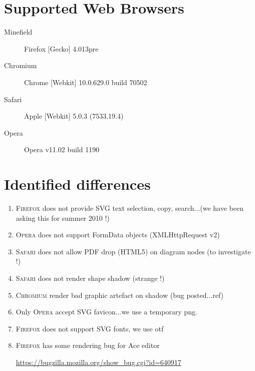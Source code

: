 \documentclass{article}
\newcommand{\ff}{\textsc{Firefox}\xspace}
\newcommand{\ch}{\textsc{Chromium}\xspace}
\newcommand{\sa}{\textsc{Safari}\xspace}
\newcommand{\op}{\textsc{Opera}\xspace}
\begin{document}
\section{Supported Web Browsers}
\date{\today}
\begin{description}
\item[Minefield] Firefox [Gecko] 4.013pre
\item[Chromium] Chrome [Webkit] 10.0.629.0 build 70502
\item[Safari] Apple [Webkit] 5.0.3 (7533.19.4)
\item[Opera] Opera v11.02 build 1190
\end{description}

\section{Identified differences}
\begin{enumerate}
\item \ff does not provide SVG text selection, copy, search...(we have been asking this for summer 2010 !)
\item \op does not support FormData objects (XMLHttpRequest v2)
\item \sa does not allow PDF drop (HTML5) on diagram nodes (to investigate !)
\item \sa does not render shape shadow (strange !)
\item \ch render bad graphic artefact on shadow (bug posted...ref)
\item Only \op accept SVG favicon...we use a temporary png. 
\item \ff does not support SVG fonts, we use otf
\item \ff has some rendering bug for Ace editor 

\url{https://bugzilla.mozilla.org/show\_bug.cgi?id=640917}

\end{enumerate}
\end{document}
